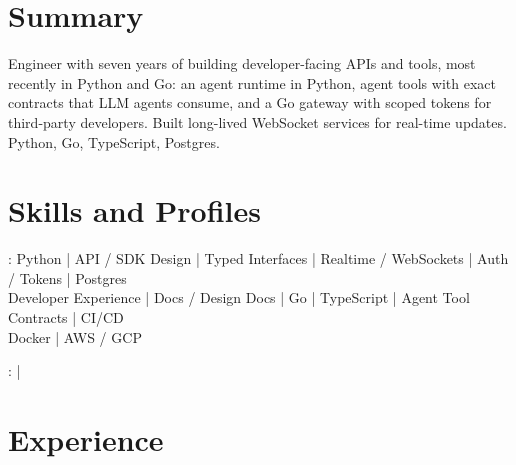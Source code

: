 \documentclass[print]{jack-resume}
\begin{document}
\pagecolor{darkmodeBackground}


\begin{minipage}[t][1cm][t]{.03\textwidth}
    \hfill
\end{minipage}

\section{Summary}
Engineer with seven years of building developer-facing APIs and tools, most recently in Python and Go: an agent runtime in Python, agent tools with exact contracts that LLM agents consume, and a Go gateway with scoped tokens for third-party developers. Built long-lived WebSocket services for real-time updates. Python, Go, TypeScript, Postgres.
\sectionsep

\section{Skills and Profiles}
:
Python \hfill | \hfill
API / SDK Design \hfill | \hfill
Typed Interfaces \hfill | \hfill
Realtime / WebSockets \hfill | \hfill
Auth / Tokens \hfill | \hfill
Postgres \\
\hspace{1.0cm} Developer Experience \hfill | \hfill
Docs / Design Docs \hfill | \hfill
Go \hfill | \hfill
TypeScript \hfill | \hfill
Agent Tool Contracts \hfill | \hfill
CI/CD \\
\hspace{1.0cm} Docker \hfill | \hfill
AWS / GCP \\

\raggedright{
    :
      \href{https://www.linkedin.com/in/jack-sturtevant/}{ \ExternalLink} |
     \href{https://github.com/jacksturt}{ \ExternalLink}}

\section{Experience}
\end{document}
